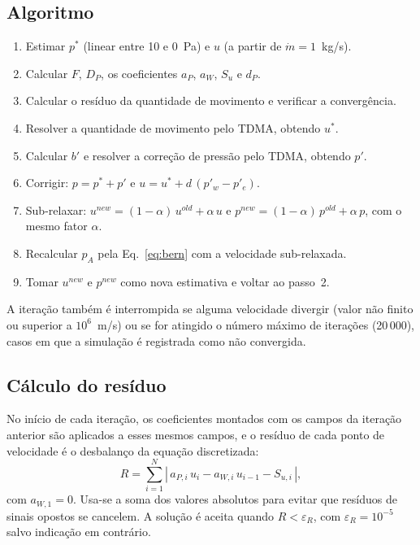 \documentclass[11pt,a4paper]{article}
\begin{document}
\subsection{Algoritmo}

\begin{enumerate}
  \item Estimar $p^*$ (linear entre 10 e 0~Pa) e $u$ (a partir de
        $\dot m=1$~kg/s).
  \item Calcular $F$, $D_P$, os coeficientes $a_P$, $a_W$, $S_u$ e $d_P$.
  \item Calcular o resíduo da quantidade de movimento e verificar a
        convergência.
  \item Resolver a quantidade de movimento pelo TDMA, obtendo $u^*$.
  \item Calcular $b'$ e resolver a correção de pressão pelo TDMA,
        obtendo $p'$.
  \item Corrigir: $p=p^*+p'$ e $u=u^*+d\,(p'_w-p'_e)$.
  \item Sub-relaxar: $u^{new}=(1-\alpha)\,u^{old}+\alpha\,u$ e
        $p^{new}=(1-\alpha)\,p^{old}+\alpha\,p$, com o mesmo fator $\alpha$.
  \item Recalcular $p_A$ pela Eq.~\eqref{eq:bern} com a velocidade
        sub-relaxada.
  \item Tomar $u^{new}$ e $p^{new}$ como nova estimativa e voltar ao
        passo~2.
\end{enumerate}
A iteração também é interrompida se alguma velocidade divergir (valor não
finito ou superior a $10^6$~m/s) ou se for atingido o número máximo de
iterações (20\,000), casos em que a simulação é registrada como não
convergida.

\subsection{Cálculo do resíduo}

No início de cada iteração, os coeficientes montados com os campos da
iteração anterior são aplicados a esses mesmos campos, e o resíduo de cada
ponto de velocidade é o desbalanço da equação discretizada:
\begin{equation}
  R=\sum_{i=1}^{N}\left|\,a_{P,i}\,u_i-a_{W,i}\,u_{i-1}-S_{u,i}\,\right| ,
\end{equation}
com $a_{W,1}=0$. Usa-se a soma dos valores absolutos para evitar que
resíduos de sinais opostos se cancelem. A solução é aceita quando
$R<\varepsilon_R$, com $\varepsilon_R=10^{-5}$ salvo indicação em
contrário.
\end{document}
